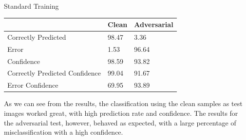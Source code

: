 \begin{tframe}{Standard Training}

\begin{table}[h]
\centering
\begin{tabular}{@{}lll@{}}
\toprule
                               & Clean & Adversarial \\ \midrule
Correctly Predicted            & 98.47 & 3.36        \\
Error                          & 1.53  & 96.64       \\
Confidence                     & 98.59 & 93.82       \\
Correctly Predicted Confidence & 99.04 & 91.67       \\
Error Confidence               & 69.95 & 93.89       \\ \bottomrule
\end{tabular}
\end{table}

As we can see from the results, the classification using the clean samples as test images worked great, with high prediction rate and confidence. The results for the adversarial test, however, behaved as expected, with a large percentage of misclassification with a high confidence.

\end{tframe}